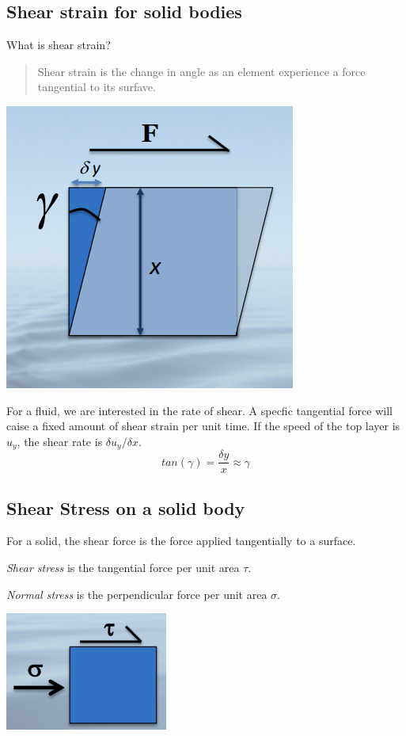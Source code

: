 \documentclass[class=report, crop=false, 12pt,a4paper]{standalone}
\begin{document}
\subsection{Shear strain for solid bodies}
What is shear strain?
\begin{quote}
  \begin{center}
    Shear strain is the change in angle as an element experience a force tangential to its surfave.
  \end{center}
\end{quote}
\begin{center}
  \includegraphics[width = 0.4 \textwidth]{../img/ShearStrainDiagram}
\end{center}
For a fluid, we are interested in the rate of shear. A specfic tangential force will caise a fixed amount of shear strain per unit time. If the speed of the top layer is \( u_y\), the shear rate is \(\delta u_y / \delta x\).
\begin{equation}
  tan(\gamma) = \frac{\delta y}{x} \approx \gamma
\end{equation}

\subsection{Shear Stress on a solid body}
For a solid, the shear force is the force applied tangentially to a surface.

\emph{Shear stress} is the tangential force per unit area \( \tau\).

\emph{Normal stress} is the perpendicular force per unit area \( \sigma \).

\begin{center}
  \includegraphics[width = 0.4 \textwidth]{../img/ShearForceDiagram}
\end{center}
\end{document}
